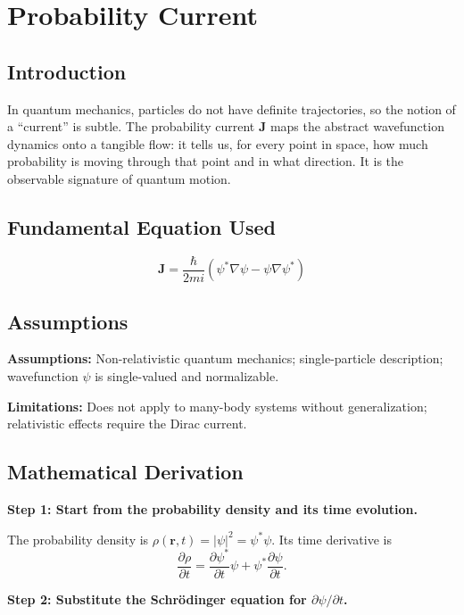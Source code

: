 \chapter{Probability Current}

\section*{Introduction}

In quantum mechanics, particles do not have definite trajectories, so the notion of a ``current'' is subtle. The probability current $\mathbf{J}$ maps the abstract wavefunction dynamics onto a tangible flow: it tells us, for every point in space, how much probability is moving through that point and in what direction. It is the observable signature of quantum motion.
\section*{Fundamental Equation Used}

\begin{equation}
\mathbf{J} = \frac{\hbar}{2mi}\left(\psi^*\nabla\psi - \psi\nabla\psi^*\right)
\end{equation}
\section*{Assumptions}

\textbf{Assumptions:} Non-relativistic quantum mechanics; single-particle description; wavefunction $\psi$ is single-valued and normalizable.


\textbf{Limitations:} Does not apply to many-body systems without generalization; relativistic effects require the Dirac current.


\section*{Mathematical Derivation}

\textbf{Step 1: Start from the probability density and its time evolution.}

The probability density is $\rho(\mathbf{r},t) = |\psi|^2 = \psi^*\psi$. Its time derivative is
\begin{equation}
\frac{\partial\rho}{\partial t} = \frac{\partial\psi^*}{\partial t}\psi + \psi^*\frac{\partial\psi}{\partial t}.
\end{equation}

\textbf{Step 2: Substitute the Schr\"{o}dinger equation for $\partial\psi/\partial t$.}

